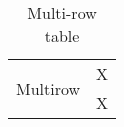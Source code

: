 \begin{table}[ht]
\caption{Multi-row table}
\begin{center}
\begin{tabular}{cc}
    \hline
    \multirow{2}{*}{Multirow}&X\\
    &X\\
    \hline
\end{tabular}
\end{center}
\label{tab:multicol}
\end{table}
